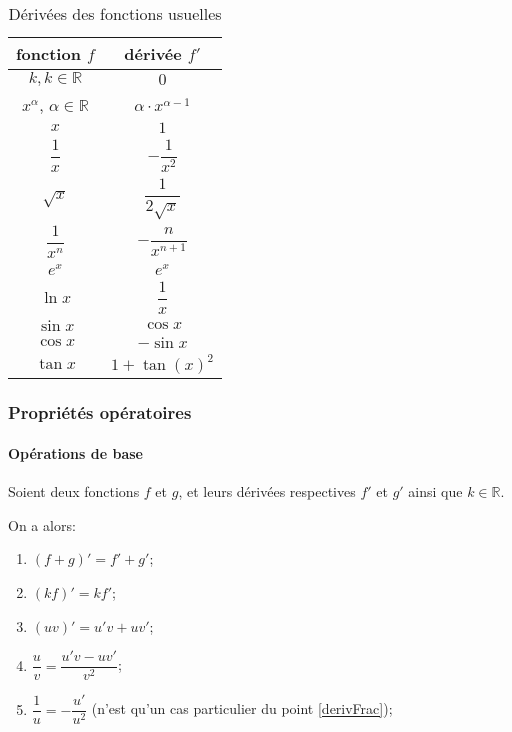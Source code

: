 \documentclass[a4paper,12pt]{scrartcl}
\begin{document}
\begin{table}[h!]
\centering
\begin{tabular}{|c|c|}
\hline
\textbf{fonction $f$} & \textbf{dérivée $f'$} \\ \hline
$k, k \in \mathbb{R}$ & $0$ \\  \hline\hline 
 $x^\alpha$, $\alpha \in \mathbb{R}$ & $\alpha \cdot x^{\alpha-1}$ \\ \hline
 $x$ & $1$ \\ \hline
 $\dfrac{1}{x}$ & $-\dfrac{1}{x^2}$ \\ \hline
 $\sqrt{x}$ & $\dfrac{1}{2\sqrt{x}}$ \\ \hline
 $\dfrac{1}{x^n}$ & $-\dfrac{n}{x^{n+1}}$ \\ \hline\hline
  $e^x$ & $e^x$ \\ \hline
  $\ln x$ & $\dfrac{1}{x} $ \\ \hline\hline
 $\sin x$ & $\cos x$ \\ \hline
 $\cos x$ & $-\sin x$ \\ \hline
 $\tan x$ & $1+\tan\left(x\right)^{2}$ \\ \hline
\end{tabular}
 \caption{Dérivées des fonctions usuelles}
 \label{tab:usuelles}
\end{table}

\subsubsection{Propriétés opératoires}

\paragraph{Opérations de base}

Soient deux fonctions $f$ et $g$, et leurs dérivées respectives $f'$ et $g'$ ainsi que $k \in \mathbb{R}$. 

On a alors:

\begin{enumerate}
 \item $(f+g)' = f'+g'$; \label{regle:somme}
 \item $(kf)' = kf'$;
 \item $(uv)' = u'v + uv'$;\label{derivProd}
 \item $\dfrac{u}{v} = \dfrac{u'v - uv'}{v^2}$;\label{derivFrac}
 \item $\dfrac{1}{u} = -\dfrac{u'}{u^2}$ (n'est qu'un cas particulier du point \ref{derivFrac});
\end{enumerate}
\end{document}
